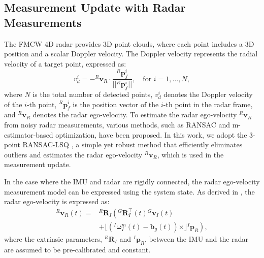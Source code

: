 \subsection{Measurement Update with Radar Measurements}
\label{sec: measurement update}
The FMCW 4D radar provides 3D point clouds, where each point includes a 3D position and a scalar Doppler velocity. The Doppler velocity represents the radial velocity of a target point, expressed as:
\begin{equation}
    v_d^i = -{}^R\mathbf{v}_R \cdot \frac{{}^R\mathbf{p}_f^i}{||{}^R\mathbf{p}_f^i||}, \quad \text{for } i = 1, \dots, N,
\end{equation}
where \( N \) is the total number of detected points, \( v_d^i \) denotes the Doppler velocity of the \( i \)-th point, \( {}^R\mathbf{p}_f^i \) is the position vector of the \( i \)-th point in the radar frame, and ${}^R\mathbf{v}_R$ denotes the radar ego-velocity. To estimate the radar ego-velocity \( {}^R\mathbf{v}_R \) from noisy radar measurements, various methods, such as RANSAC and m-estimator-based optimization, have been proposed. In this work, we adopt the 3-point RANSAC-LSQ \cite{9235254}, a simple yet robust method that efficiently eliminates outliers and estimates the radar ego-velocity \( {}^R\mathbf{v}_R \), which is used in the measurement update.

In the case where the IMU and radar are rigidly connected, the radar ego-velocity measurement model can be expressed using the system state. As derived in \cite{9235254}, the radar ego-velocity is expressed as:
\begin{equation}
\label{ego_vel}
    \begin{aligned}
        {}^R\mathbf{v}_R(t) =& {}^R\mathbf{R}_I \left( {}^G\mathbf{R}_I^\top(t) {}^G\mathbf{v}_I(t) \right. \\
        &+ \left. \lfloor ({}^I\boldsymbol{\omega}_I^m(t) - \mathbf{b}_g(t)) \times \rfloor {}^I\mathbf{p}_R \right),
    \end{aligned}
\end{equation}
where the extrinsic parameters, \( {}^R\mathbf{R}_I \) and \( {}^I\mathbf{p}_R \), between the IMU and the radar are assumed to be pre-calibrated and constant.

